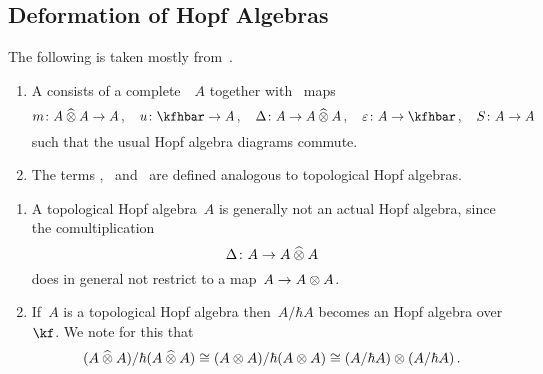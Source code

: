 \documentclass[a4paper, 11pt, oneside]{scrartcl}
\begin{document}



\subsection{Deformation of Hopf Algebras}

The following is taken mostly from~\cite[Chapter~6]{guide_to_quantum_groups}.

\begin{definition}
  \label{topological definitions}
  \begin{enumerate}
    \leavevmode
    \item
      A  consists of a complete~\module{$\kfhbar$}~$A$ together with~\linear{$\kfhbar$} maps
      \[
        m \colon A \ctensor A \to A \,,
        \quad
        u \colon \kfhbar \to A \,,
        \quad
        \Delta \colon A \to A \ctensor A \,,
        \quad
        \varepsilon \colon A \to \kfhbar \,,
        \quad
        S \colon A \to A
      \]
      such that the usual Hopf algebra diagrams commute.
    \item
      The terms ,~ and~ are defined analogous to topological Hopf algebras.
  \end{enumerate}
\end{definition}

\begin{remark}
  \leavevmode
  \begin{enumerate}
    \item
      A topological Hopf algebra~$A$ is generally not an actual Hopf algebra, since the comultiplication
      \[
        \Delta
        \colon
        A
        \to
        A \mathbin{\widehat{\otimes}} A
      \]
      does in general not restrict to a map~$A \to A \otimes A$.
    \item
      If~$A$ is a topological Hopf algebra then~$A / \hbar A$ becomes an Hopf algebra over~$\kf$.
      We note for this that
      \[
        (A \mathbin{\widehat{\otimes}} A) / \hbar (A \mathbin{\widehat{\otimes}} A)
        \cong
        (A \otimes A) / \hbar (A \otimes A)
        \cong
        (A / \hbar A) \otimes (A / \hbar A) \,.
      \]
  \end{enumerate}
\end{remark}
\end{document}
